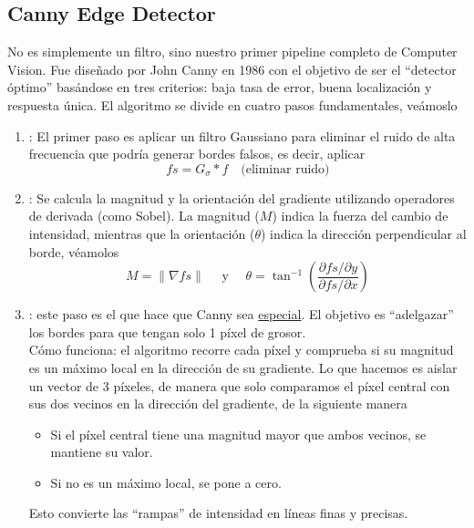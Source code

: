 \subsection{Canny Edge Detector}
\noindent
No es simplemente un filtro, sino nuestro primer pipeline completo de Computer Vision. Fue diseñado por John Canny en 1986 con el objetivo de ser el ``detector óptimo'' basándose en tres criterios: baja tasa de error, buena localización y respuesta única. El algoritmo se divide en cuatro pasos fundamentales, veámoslo
\begin{enumerate}
    \item {}: El primer paso es aplicar un filtro Gaussiano para eliminar el ruido de alta frecuencia que podría generar bordes falsos, es decir, aplicar
    \begin{equation*}
            fs = G_\sigma \ast f \quad \text{(eliminar ruido)}
    \end{equation*}
    \item {}: Se calcula la magnitud y la orientación del gradiente utilizando operadores de derivada (como Sobel). La magnitud ($M$) indica la fuerza del cambio de intensidad, mientras que la orientación ($\theta$) indica la dirección perpendicular al borde, véamolos
    \begin{equation*}
        M = \|\nabla fs\| \quad \text{ y } \quad \theta = \tan^{-1}\left(\frac{\partial fs / \partial y}{\partial fs / \partial x}\right)
    \end{equation*}
    \item {}: este paso es el que hace que Canny sea \underline{especial}. El objetivo es ``adelgazar'' los bordes para que tengan solo 1 píxel de grosor. \\
    \noindent
    Cómo funciona: el algoritmo recorre cada píxel y comprueba si su magnitud es un máximo local en la dirección de su gradiente. Lo que hacemos es aislar un vector de 3 píxeles, de manera que solo comparamos el píxel central con sus dos vecinos en la dirección del gradiente, de la siguiente manera
    \begin{itemize}
        \item Si el píxel central tiene una magnitud mayor que ambos vecinos, se mantiene su valor.
        \item Si no es un máximo local, se pone a cero.
    \end{itemize}
    Esto convierte las ``rampas'' de intensidad en líneas finas y precisas.

\end{enumerate}
